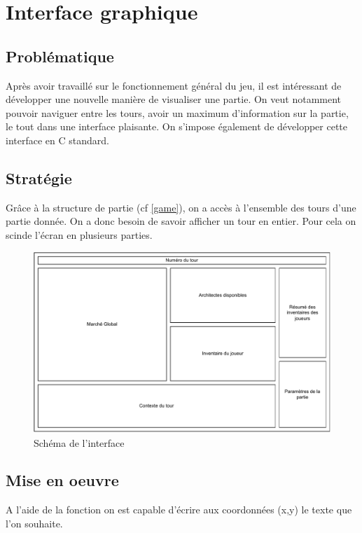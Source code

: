 \section{Interface graphique}

\label{cli}

\subsection*{Problématique}

Après avoir travaillé sur le fonctionnement général du jeu, il est intéressant de développer une nouvelle manière de visualiser une partie. On veut notamment pouvoir naviguer entre les tours, avoir un maximum d'information sur la partie, le tout dans une interface plaisante. On s'impose également de développer cette interface en C standard.

\subsection{Stratégie}

Grâce à la structure de partie (cf \ref{game}), on a accès à l'ensemble des tours d'une partie donnée. On a donc besoin de savoir afficher un tour en entier. Pour cela on scinde l'écran en plusieurs parties.

\begin{figure}[H]
    \centering
    \includegraphics[width=\textwidth]{img/cli_schema.pdf}
    \caption{Schéma de l'interface}
    \label{fig:cli_schem}
\end{figure}

\subsection{Mise en oeuvre}
A l'aide de la fonction  on est capable d'écrire aux coordonnées (x,y) le texte que l'on souhaite.


